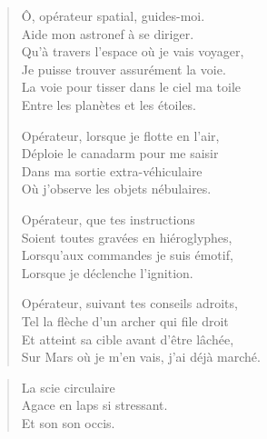 \begin{verse}\quatrain\sizain
  Ô, opérateur spatial, guides-moi.\\ 
  Aide mon astronef à se diriger.\\ 
  Qu’à travers l’espace où je vais voyager,\\ 
  Je puisse trouver assurément la voie.\\ 
  La voie pour tisser dans le ciel ma toile\\ 
  Entre les planètes et les étoiles.  %

  Opérateur, lorsque je flotte en l’air,\\ 
  Déploie le canadarm%
   pour me saisir\\  %
  Dans ma sortie extra-véhiculaire\\  %
  Où j’observe les objets nébulaires.  %

  Opérateur, que tes instructions\\  %
  Soient toutes gravées en hiéroglyphes,\\  %
  Lorsqu’aux commandes je suis émotif,\\  %
  Lorsque je déclenche l’ignition.  %

  Opérateur, suivant tes conseils adroits,\\ 
  Tel la flèche d’un archer qui file droit\\ 
  Et atteint sa cible avant d’être lâchée,\\ 
  Sur Mars où je m’en vais, j’ai déjà marché.  %
\end{verse}


\begin{verse}\haiku
  La scie circulaire\\  %
  Agace en laps si stressant.\\  %
  Et son son occis.
\end{verse}

